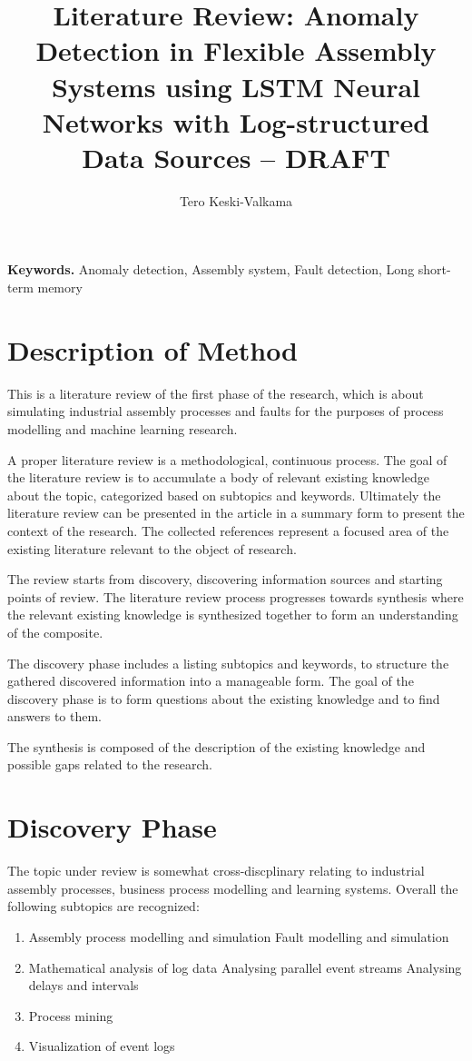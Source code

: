 \documentclass[a4paper,10pt]{article}
\title{Literature Review: Anomaly Detection in Flexible Assembly Systems using LSTM Neural Networks with Log-structured Data Sources – DRAFT}
\author{Tero Keski-Valkama}
\begin{document}
\maketitle

\smallskip
\noindent \textbf{Keywords.} Anomaly detection, Assembly system, Fault detection, Long short-term memory

\section{Description of Method}

This is a literature review of the first phase of the research, which is about simulating industrial assembly processes and faults for the purposes of
process modelling and machine learning research.

A proper literature review is a methodological, continuous process. The goal of the literature review is to accumulate a body of relevant existing knowledge
about the topic, categorized based on subtopics and keywords.
Ultimately the literature review can be presented in the article in a summary form to present the context of the research.
The collected references represent a focused area of the existing literature relevant to the object of research.

The review starts from discovery, discovering information sources and starting points of review. The literature review process progresses towards synthesis
where the relevant existing knowledge is synthesized together to form an understanding of the composite.

The discovery phase includes a listing subtopics and keywords, to structure the gathered discovered information into a manageable form. The goal
of the discovery phase is to form questions about the existing knowledge and to find answers to them.

The synthesis is composed of the description of the existing knowledge and possible gaps related to the research.

\section{Discovery Phase}

The topic under review is somewhat cross-discplinary relating to industrial assembly processes, business process modelling and learning systems.
Overall the following subtopics are recognized:
\begin{enumerate}
 \item Assembly process modelling and simulation
   \subitem Fault modelling and simulation
 \item Mathematical analysis of log data
   \subitem Analysing parallel event streams
   \subitem Analysing delays and intervals
 \item Process mining
 \item Visualization of event logs
\end{enumerate}
\end{document}
